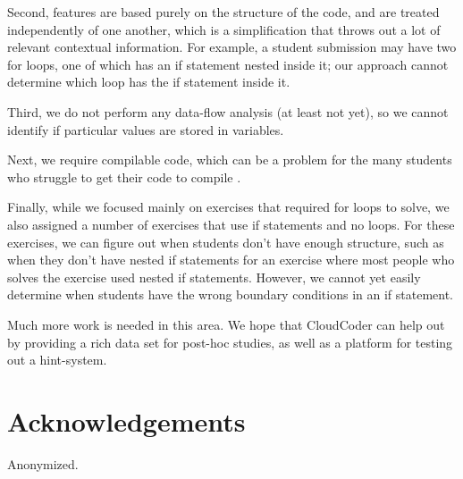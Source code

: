 \documentclass{sig-alternate}
\begin{document}
Second, features are based purely on the structure of the
code, and are treated independently of one another, which is a
simplification that throws out a lot of relevant contextual information.  For
example, a student submission may have two for loops, one of which has
an if statement nested inside it; our approach cannot determine which
loop has the if statement inside it.  

Third, we do not perform any data-flow analysis (at least not yet), so
we cannot identify if particular values are stored in variables.

Next, we require compilable code, which can be a problem for the many
students who struggle to get their code to compile
\cite{Denny:2012:SEE:2325296.2325318}.

Finally, while we focused mainly on exercises that required for loops
to solve, we also assigned a number of exercises that
use if statements and no loops.  For these exercises, we can figure
out when students don't have 
enough structure, such as when they don't have nested if statements
for an exercise where most people who solves the exercise used nested if statements.  However,
we cannot yet easily determine when students have the wrong boundary
conditions in an if statement.

Much more work is needed in this area.  We hope that 
CloudCoder can help out by providing a rich data set for post-hoc
studies, as well as a platform for testing out a hint-system.



  

\section{Acknowledgements}

Anonymized.
\end{document}
